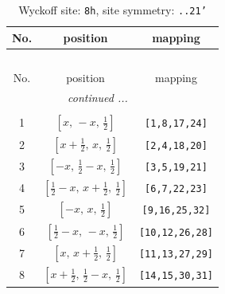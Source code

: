 \documentclass[fleqn,8pt]{jsarticle}
\begin{document}
\begin{longtable}{ccc}
\caption{Wyckoff site: {\tt 8h}, site symmetry: {\tt ..21'}}
 \\
 \hline \hline
No. & position & mapping \\ \hline \endfirsthead

\multicolumn{2}{l}{\tablename\ \thetable{}} \\
 \hline \hline
No. & position & mapping \\ \hline \endhead

 \hline \hline
\multicolumn{2}{r}{\footnotesize\it continued ...} \\ \endfoot

 \hline \hline
\multicolumn{2}{r}{} \\ \endlastfoot

1 & $\left[ x,\, - x,\, \frac{1}{2} \right]$ & {\tt [1,8,17,24]} \\ \hline
2 & $\left[ x + \frac{1}{2},\, x,\, \frac{1}{2} \right]$ & {\tt [2,4,18,20]} \\ \hline
3 & $\left[ - x,\, \frac{1}{2} - x,\, \frac{1}{2} \right]$ & {\tt [3,5,19,21]} \\ \hline
4 & $\left[ \frac{1}{2} - x,\, x + \frac{1}{2},\, \frac{1}{2} \right]$ & {\tt [6,7,22,23]} \\ \hline
5 & $\left[ - x,\, x,\, \frac{1}{2} \right]$ & {\tt [9,16,25,32]} \\ \hline
6 & $\left[ \frac{1}{2} - x,\, - x,\, \frac{1}{2} \right]$ & {\tt [10,12,26,28]} \\ \hline
7 & $\left[ x,\, x + \frac{1}{2},\, \frac{1}{2} \right]$ & {\tt [11,13,27,29]} \\ \hline
8 & $\left[ x + \frac{1}{2},\, \frac{1}{2} - x,\, \frac{1}{2} \right]$ & {\tt [14,15,30,31]} \\
\end{longtable}
\renewcommand{\arraystretch}{1.2}
\end{document}
